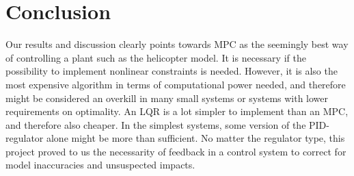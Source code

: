 \section{Conclusion}\label{sec:conclusion}
Our results and discussion clearly points towards MPC as the seemingly best way of controlling a plant such as the helicopter model. It is necessary if the possibility to implement nonlinear constraints is needed. However, it is also the most expensive algorithm in terms of computational power needed, and therefore might be considered an overkill in many small systems or systems with lower requirements on optimality.
An LQR is a lot simpler to implement than an MPC, and therefore also cheaper. In the simplest systems, some version of the PID-regulator alone might be more than sufficient. No matter the regulator type, this project proved to us the necessarity of feedback in a control system to correct for model inaccuracies and unsuspected impacts.